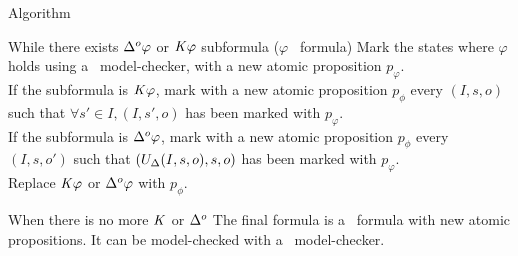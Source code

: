 \begin{frame}{Algorithm}
  \footnotesize
  \begin{block}{While there exists $\Delta^{o}\varphi$ or $\mathit{K}\varphi$ subformula ($\varphi$ \ctls\ formula)}
    Mark the states where $\varphi$ holds using a \ctls\ model-checker, with a new atomic proposition $p_{\varphi}$.\\
    If the subformula is $\mathit{K}\varphi$, mark with a new atomic proposition $p_\phi$ every $(I,s,o)$ such that $\forall s'\in I, (I,s',o)$ has been marked with $p_{\varphi}$.\\
    If the subformula is $\Delta^{o}\varphi$, mark with a new atomic proposition $p_\phi$ every $(I,s,o')$ such that $(U_{\Delta}(I,s,o),s,o)$ has been marked with $p_{\varphi}$.\\
    Replace $\mathit{K}\varphi$ or $\Delta^{o}\varphi$ with $p_\phi$.
  \end{block}
  \vfill
  \begin{exampleblock}{When there is no more $\mathit{K}$ or $\Delta^{o}$}
    The final formula is a \ctls\ formula with new atomic propositions.
    It can be model-checked with a \ctls\ model-checker.
  \end{exampleblock}
    

\end{frame}


